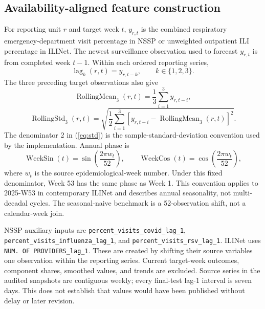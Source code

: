 \documentclass[10pt,a4paper]{article}
\begin{document}
\subsection*{Availability-aligned feature construction}
For reporting unit $r$ and target week $t$, $y_{r,t}$ is the combined respiratory emergency-department visit percentage in NSSP or unweighted outpatient ILI percentage in ILINet. The newest surveillance observation used to forecast $y_{r,t}$ is from completed week $t-1$. Within each ordered reporting series,
\begin{equation}
\operatorname{lag}_k(r,t)=y_{r,t-k},\qquad k\in\{1,2,3\}.
\label{eq:lags}
\end{equation}
The three preceding target observations also give
\begin{equation}
\operatorname{RollingMean}_3(r,t)=\frac{1}{3}\sum_{i=1}^{3}y_{r,t-i},
\label{eq:mean}
\end{equation}
\begin{equation}
\operatorname{RollingStd}_3(r,t)=\sqrt{\frac{1}{2}\sum_{i=1}^{3}
\left[y_{r,t-i}-\operatorname{RollingMean}_3(r,t)\right]^2}.
\label{eq:std}
\end{equation}
The denominator 2 in (\ref{eq:std}) is the sample-standard-deviation convention used by the implementation. Annual phase is
\begin{equation}
\operatorname{WeekSin}(t)=\sin\!\left(\frac{2\pi w_t}{52}\right),\qquad
\operatorname{WeekCos}(t)=\cos\!\left(\frac{2\pi w_t}{52}\right),
\label{eq:season}
\end{equation}
where $w_t$ is the source epidemiological-week number. Under this fixed denominator, Week 53 has the same phase as Week 1. This convention applies to 2025-W53 in contemporary ILINet and describes annual seasonality, not multi-decadal cycles. The seasonal-naive benchmark is a 52-observation shift, not a calendar-week join.

NSSP auxiliary inputs are \nolinkurl{percent_visits_covid_lag_1}, \nolinkurl{percent_visits_influenza_lag_1}, and \nolinkurl{percent_visits_rsv_lag_1}. ILINet uses \nolinkurl{NUM. OF PROVIDERS_lag_1}. These are created by shifting their source variables one observation within the reporting series. Current target-week outcomes, component shares, smoothed values, and trends are excluded. Source series in the audited snapshots are contiguous weekly; every final-test lag-1 interval is seven days. This does not establish that values would have been published without delay or later revision.
\end{document}
